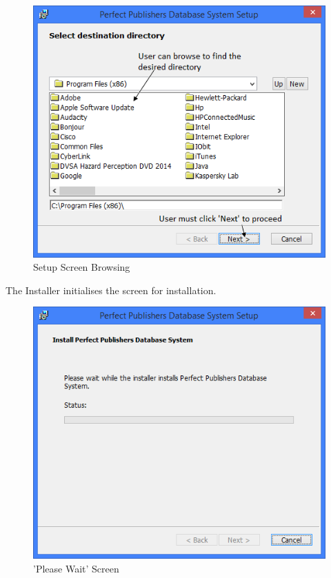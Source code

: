 \begin{figure}[H]
    \includegraphics[width=\textwidth]{./Manual/Installation/Setup2.png}
    \caption{Setup Screen Browsing}
\end{figure}

The Installer initialises the screen for installation.

\begin{figure}[H]
    \includegraphics[width=\textwidth]{./Manual/Installation/PleaseWaitScreen.png}
    \caption{'Please Wait' Screen}
\end{figure}

